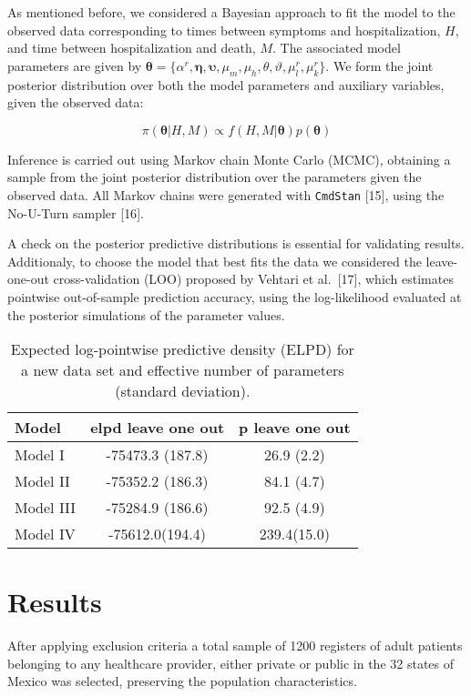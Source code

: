 \documentclass[10pt,letterpaper]{article}
\begin{document}
As mentioned before, we considered a Bayesian approach to fit the model
to the observed data corresponding to times between symptoms and
hospitalization, \(H\), and time between hospitalization and death,
\(M\). The associated model parameters are given by
\(\bm{\theta}=\{\alpha^r,\mathbf{\eta},\mathbf{\upsilon},\mu_m,\mu_h,\theta,\vartheta,\mu^r_l,\mu^r_k\}\).
We form the joint posterior distribution over both the model parameters
and auxiliary variables, given the observed data:

\[
\pi(\bm{\theta}|H,M)\propto f(H,M|\bm{\theta})p(\bm{\theta})
\]

Inference is carried out using Markov chain Monte Carlo (MCMC),
obtaining a sample from the joint posterior distribution over the
parameters given the observed data. All Markov chains were generated
with \texttt{CmdStan} {[}15{]}, using the No-U-Turn sampler {[}16{]}.

A check on the posterior predictive distributions is essential for
validating results. Additionaly, to choose the model that best fits the
data we considered the leave-one-out cross-validation (LOO) proposed by
Vehtari et al.~{[}17{]}, which estimates pointwise out-of-sample
prediction accuracy, using the log-likelihood evaluated at the posterior
simulations of the parameter values.

\begin{table}[!htb]
\centering
\begin{tabular}{lcc}
\hline
{\textbf{Model}} & {\textbf{elpd leave one out}} & {\textbf{p leave one out}} \\
\hline Model I  &  -75473.3 (187.8) & 26.9 (2.2) \\
Model II          &   -75352.2 (186.3) &  84.1 (4.7)\\
Model III         &    -75284.9 (186.6) &  92.5 (4.9)  \\
Model IV & -75612.0(194.4) & 239.4(15.0) \\
\hline
\end{tabular}
\caption{\label{tab:gof} Expected log-pointwise predictive density (ELPD) for a new data set and effective number of parameters (standard deviation).}
\end{table}

\hypertarget{results}{%
\section{Results}\label{results}}

After applying exclusion criteria a total sample of 1200 registers of
adult patients belonging to any healthcare provider, either private or
public in the 32 states of Mexico was selected, preserving the
population characteristics.
\end{document}
